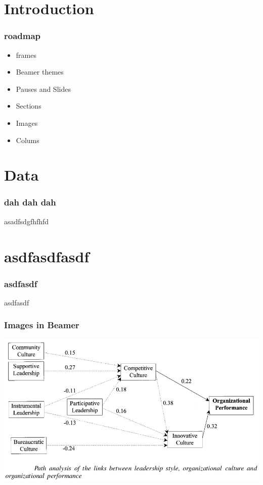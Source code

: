 



\maketitle

\section{Introduction}


\begin{frame}
\frametitle{roadmap}

\begin{itemize}
\item frames
\item Beamer themes
\item Pauses and Slides
\item Sections
\item Images
\item Colums
\end{itemize}

\end{frame}

\section{Data}

\begin{frame}
\frametitle{dah dah dah}

asadfsdgfhfhfd

\end{frame}

\section{asdfasdfasdf}

\begin{frame}
\frametitle{asdfasdf}

asdfasdf

\end{frame}



\begin{frame}
\frametitle{Images in Beamer}

\includegraphics[scale=0.1]{./image/OB/CORGA_1.jpg}

\end{frame}

